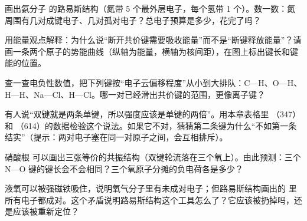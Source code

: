 \begin{sikaoti}
\item 画出氨分子  的路易斯结构（氮带 5 个最外层电子，每个氢带 1 个）。数一数：氮周围有几对成键电子、几对孤对电子？总电子预算是多少，花完了吗？
\item 用能量观点解释：为什么说“断开共价键需要吸收能量”而不是“断键释放能量”？请画一条两个原子的势能曲线（纵轴为能量，横轴为核间距），在图上标出键长和键能的位置。
\item 查一查电负性数值，把下列键按“电子云偏移程度”从小到大排队：C—H、O—H、H—H、Na—Cl、H—Cl。哪一对已经滑出共价键的范围，更像离子键？
\item 有人说“双键就是两条单键，所以强度应该是单键的两倍”。用本章表格里 （347）和 （614）的数据检验这个说法。如果它不对，猜猜第二条键为什么“不如第一条结实”（提示：两对电子塞在同一对原子之间，会互相排斥）。
\item 硝酸根  可以画出三张等价的共振结构（双键轮流落在三个氧上）。由此预测：三个 N—O 键的键长会不会相同？三个氧原子分摊的负电荷各是多少？
\item 液氧可以被强磁铁吸住，说明氧气分子里有未成对电子；但路易斯结构画出的  里所有电子都成对。这个矛盾说明路易斯结构这个工具怎么了？它应该被扔掉吗，还是应该被重新定位？
\end{sikaoti}
